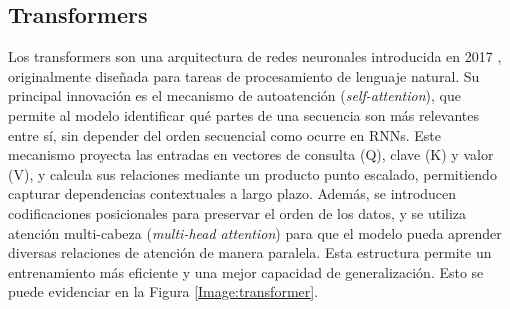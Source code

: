 \subsection{Transformers} \label{transformer}

Los transformers son una arquitectura de redes neuronales 
introducida en 2017 \cite{vaswani2017attention}, 
originalmente diseñada para tareas de procesamiento de 
lenguaje natural. Su principal innovación es el mecanismo 
de autoatención (\textit{self-attention}), 
que permite al modelo identificar qué partes de una secuencia 
son más relevantes entre sí, sin depender del orden 
secuencial como ocurre en RNNs. Este mecanismo proyecta las 
entradas en vectores de consulta (Q), clave (K) y valor (V), 
y calcula sus relaciones mediante un producto punto escalado, 
permitiendo capturar dependencias contextuales a largo plazo. 
Además, se introducen codificaciones posicionales para 
preservar el orden de los datos, y se utiliza atención 
multi-cabeza (\textit{multi-head attention}) para que el modelo pueda 
aprender diversas relaciones de atención de manera paralela. 
Esta estructura permite un entrenamiento más eficiente y una 
mejor capacidad de generalización. Esto se puede evidenciar en 
la Figura \ref{Image:transformer}.

